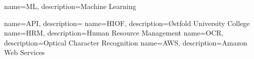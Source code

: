 \RequirePackage{glossaries}
\makeglossaries

{
    name=ML,
    description={Machine Learning}
}

{
    name=API,
    description={}
}
{
    name=HIOF,
    description={Østfold University College}
}
{
    name=HRM,
    description={Human Resource Management}
}
{
    name=OCR,
    description={Optical Character Recognition}
}
{
    name=AWS,
    description={Amazon Web Services}
}
